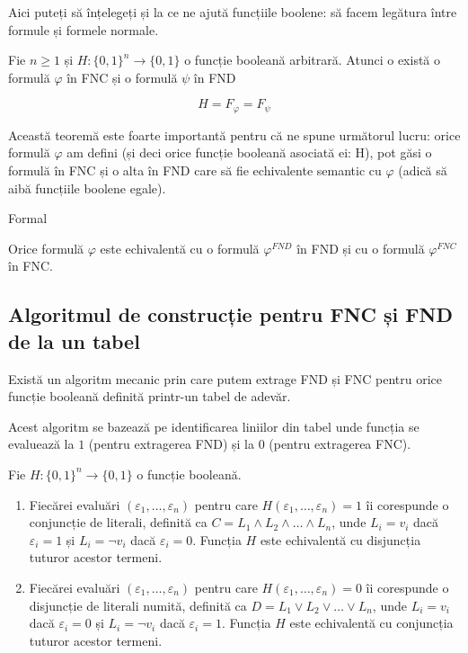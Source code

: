 Aici puteți să înțelegeți și la ce ne ajută funcțiile boolene: să facem legătura între formule și formele normale.

\begin{theorem}
	Fie \( n \geq 1 \) și \( H : \{0, 1\}^n \to \{0, 1\} \) o funcție booleană arbitrară. Atunci o există o formulă \( \varphi \) în FNC și
	o formulă \( \psi \) în FND

	\[
		H = F_\varphi = F_\psi
	\]
\end{theorem}

Această teoremă este foarte importantă pentru că ne spune următorul lucru: orice formulă \( \varphi \) am defini (și deci orice funcție booleană asociată ei: H), pot
găsi o formulă în FNC și o alta în FND care să fie echivalente semantic cu \( \varphi \) (adică să aibă funcțiile boolene egale).

Formal

\begin{theorem}
	Orice formulă \( \varphi \)  este echivalentă cu o formulă \( \varphi^{FND} \) în FND și cu o formulă
	\( \varphi^{FNC} \) în FNC.
\end{theorem}

\subsection{Algoritmul de construcție pentru FNC și FND de la un tabel}

\label{alg1:fn}

Există un algoritm mecanic prin care putem extrage FND și FNC pentru orice funcție booleană definită printr-un tabel de adevăr.

Acest algoritm se bazează pe identificarea liniilor din tabel unde funcția se evaluează la $1$ (pentru extragerea FND) și la $0$ (pentru extragerea FNC).

\newpage

\begin{prop}
	Fie $H: \{0, 1\}^n \to \{0, 1\}$ o funcție booleană.
	\begin{enumerate}
		\item[(i)] Fiecărei evaluări $(\varepsilon_1, \dots, \varepsilon_n)$ pentru care $H(\varepsilon_1, \dots, \varepsilon_n) = 1$ îi
			corespunde o conjuncție de literali, definită ca $C = L_1 \land L_2 \land \dots \land L_n$, unde $L_i = v_i$ dacă $\varepsilon_i = 1$ și $L_i = \neg v_i$ dacă $\varepsilon_i = 0$. Funcția $H$ este echivalentă cu disjuncția tuturor acestor termeni.
		\item[(ii)]  Fiecărei evaluări $(\varepsilon_1, \dots, \varepsilon_n)$ pentru care $H(\varepsilon_1, \dots, \varepsilon_n) = 0$ îi corespunde o disjuncție de literali numită, definită ca $D = L_1 \lor L_2 \lor \dots \lor L_n$, unde $L_i = v_i$ dacă $\varepsilon_i = 0$ și $L_i = \neg v_i$ dacă $\varepsilon_i = 1$. Funcția $H$ este echivalentă cu conjuncția tuturor acestor termeni.
	\end{enumerate}
\end{prop}

